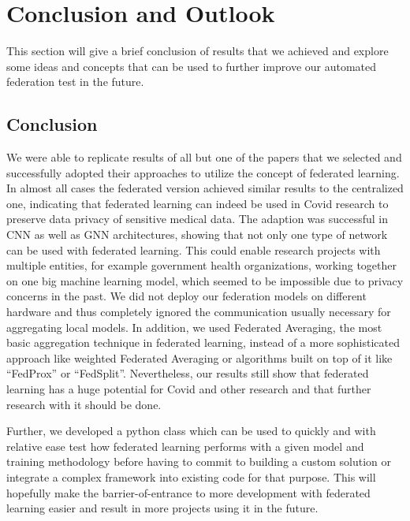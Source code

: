 \section{Conclusion and Outlook}
This section will give a brief conclusion of results that we achieved and explore some ideas and concepts that can be used to further improve our automated federation test in the future.  

\subsection{Conclusion}
We were able to replicate results of all but one of the papers that we selected and successfully adopted their approaches to utilize the concept of federated learning. In almost all cases the federated version achieved similar results to the centralized one, indicating that federated learning can indeed be used in Covid research to preserve data privacy of sensitive medical data. The adaption was successful in CNN as well as GNN architectures, showing that not only one type of network can be used with federated learning. This could enable research projects with multiple entities, for example government health organizations, working together on one big machine learning model, which seemed to be impossible due to privacy concerns in the past.
We did not deploy our federation models on different hardware and thus completely ignored the communication usually necessary for aggregating local models. In addition, we used Federated Averaging, the most basic aggregation technique in federated learning, instead of a more sophisticated approach like weighted Federated Averaging or algorithms built on top of it like \enquote{FedProx}\cite{fed_prox} or \enquote{FedSplit}\cite{fed_split}. Nevertheless, our results still show that federated learning has a huge potential for Covid and other research and that further research with it should be done.

Further, we developed a python class which can be used to quickly and with relative ease test how federated learning performs with a given model and training methodology before having to commit to building a custom solution or integrate a complex framework into existing code for that purpose. This will hopefully make the barrier-of-entrance to more development with federated learning easier and result in more projects using it in the future.

